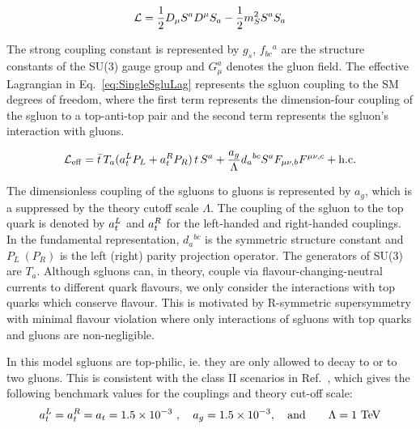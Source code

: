 \begin{equation}
 {\cal L}= \frac{1}{2}D_{\mu}S^aD^{\mu} S_a
          -\frac{1}{2}m_S^2 S^a S_a
          \label{eqn:sgluonLag}
\end{equation}



The strong coupling constant is represented by $g_s$, $f_{bc}{}^a$ are the structure
constants of the SU(3) gauge group and $G_\mu^a$ denotes the gluon field.
The effective Lagrangian in Eq.~\ref{eq:SingleSgluLag} represents the sgluon coupling to the SM degrees of freedom, where the first term represents the dimension-four coupling of the sgluon to a top-anti-top pair and the second term represents the sgluon's interaction with gluons.

\begin{equation}
 {\cal L}_{\rm eff}= \bar t\, T_a (a_t^L P_L + a_t^R P_R)\, t\, S^a
 +\frac{a_g}{\Lambda} d_a{}^{bc} S^a F_{\mu\nu, b} F^{\mu\nu, c}
 + {\rm h.c.} 
\label{eq:SingleSgluLag}\end{equation}

The dimensionless coupling of the sgluons to gluons is represented by ${a_g}$, which is a suppressed by the theory cutoff scale $\Lambda$. The coupling of the sgluon to the top quark is denoted by $a_t^L$ and  $a_t^R$ for the left-handed and right-handed couplings. In the fundamental representation, $d_a{}^{bc}$ is the symmetric structure constant and $P_{L}~(P_{R})$ is the left (right) parity projection operator. The generators of SU(3) are $T_a$.
Although sgluons can, in theory, couple via flavour-changing-neutral currents to different quark flavours, we only consider the interactions with top quarks which conserve flavour. This is motivated by R-symmetric supersymmetry with minimal flavour violation where only interactions of sgluons with top quarks and gluons are non-negligible.

In this model sgluons are top-philic, ie. they are only allowed to decay to \ttbar or to two gluons. This is consistent with the class II scenarios in Ref.~\cite{Calvet:2012rk}, which gives the following benchmark values for the couplings and theory cut-off scale:
\begin{align}
 &a_t^L = a_t^R = a_t = 1.5\times 10^{-3}\ , \quad
 a_g = 1.5\times 10^{-3},\nonumber \quad\text{and}\quad&\Lambda = 1~{\rm TeV}
 \label{eq:benchmark}
\end{align}

